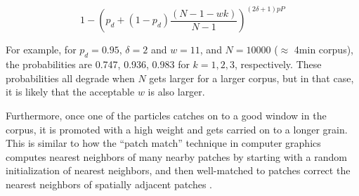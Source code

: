 \documentclass{article}
\begin{document}
\begin{equation}
    \label{eq:timeadjacentprobmodified}
    1 - \left( p_d + (1-p_d) \frac{(N-1-wk)}{N-1} \right)^{(2 \delta +1)pP}
\end{equation}

For example, for $p_d = 0.95$, $\delta=2$ and $w = 11$, and $N=10000$ ($\approx$ 4min corpus), the probabilities are 0.747, 0.936, 0.983 for $k=1, 2, 3$, respectively.  These probabilities all degrade when $N$ gets larger for a larger corpus, but in that case, it is likely that the acceptable $w$ is also larger.

Furthermore, once one of the particles catches on to a good window in the corpus, it is promoted with a high weight and gets carried on to a longer grain.  This is similar to how the ``patch match'' technique in computer graphics \cite{Barnes:2009:PAR, Barnes:2010:TGP} computes nearest neighbors of many nearby patches by starting with a random initialization of nearest neighbors, and then well-matched to patches correct the nearest neighbors of  spatially adjacent patches \cite{Barnes:2009:PAR}.




\end{document}
